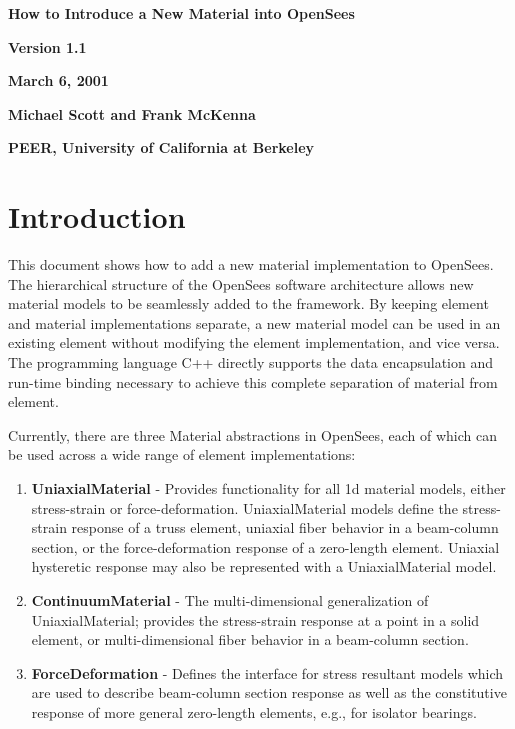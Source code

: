 \documentclass[12pt]{article}
\begin{document}


\begin{center}
{\bf \Large How to Introduce a New Material into OpenSees}

{\bf Version 1.1} 

{\bf March 6, 2001} 

{\bf Michael Scott and Frank McKenna} 

{\bf PEER, University of California at Berkeley}
\end{center}


\section{Introduction}
This document shows how to add a new material implementation to OpenSees. The hierarchical
structure of the OpenSees software architecture allows new material models
to be seamlessly added to the framework. By keeping element and material implementations
separate, a new material model can be used in an existing element without modifying
the element implementation, and vice versa. The programming language C++ directly supports
the data encapsulation and run-time binding necessary to achieve this complete separation 
of material from element.

Currently, there are three Material abstractions in OpenSees, each of which can be used 
across a wide range of element implementations:

\begin{enumerate}
\item{\bf UniaxialMaterial} - Provides functionality for all 1d material models, either
stress-strain or force-deformation.
UniaxialMaterial models define the stress-strain response of a truss element, uniaxial 
fiber behavior in a
beam-column section, or the force-deformation response of a zero-length element.
Uniaxial hysteretic response may also be represented with a UniaxialMaterial model.

\item{\bf ContinuumMaterial} - The multi-dimensional generalization of UniaxialMaterial;
provides the stress-strain response at a point in a solid element, or multi-dimensional
fiber behavior in a beam-column section.

\item{\bf ForceDeformation} - Defines the interface for stress resultant models which are
used to describe beam-column section response as well as the constitutive response of more
general zero-length elements, e.g., for isolator bearings.
\end{enumerate}
\end{document}
